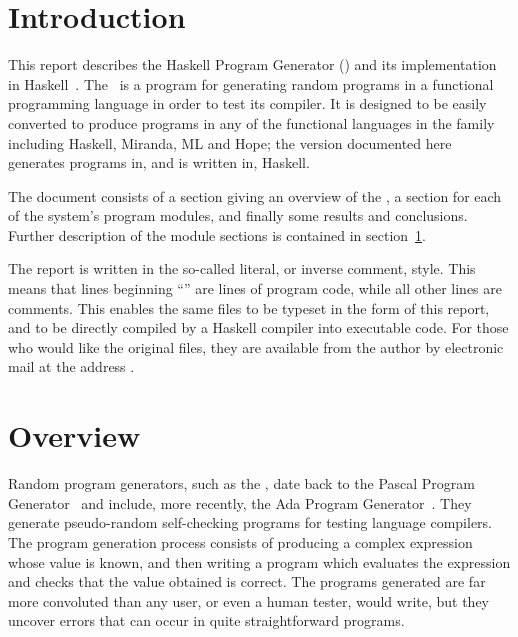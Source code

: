 


\section*{Introduction}

This report describes the Haskell Program Generator (\HPG) and its
implementation in Haskell~\cite{hudak}.
The \HPG\ is a program for generating random programs in a functional
programming language in order to test its compiler.
It is designed to be easily converted to produce programs in any of
the functional languages in the family including Haskell, Miranda,
ML and Hope; the version documented here generates programs in, and is
written in, Haskell.

The document consists of a section giving an overview of the \HPG,
a section for each of the system's program modules, and finally some
results and conclusions.
Further description of the module sections is contained in
section~\ref{overview}.

The report is written in the so-called literal, or inverse comment, style.
This means that lines beginning ``\prog{> }'' are lines of program code,
while all other lines are comments.
This enables the same files to be typeset in the form of this report, and
to be directly compiled by a Haskell compiler into executable code.
For those who would like the original files, they are available from the
author by electronic mail at the address .


\section{Overview}
\label{overview}

Random program generators, such as the \HPG, date back to the Pascal
Program Generator~\cite{wichmann} and include, more recently, the Ada
Program Generator~\cite{austin}.
They generate pseudo-random self-checking programs for testing language
compilers.
The program generation process consists of producing a complex expression
whose value is known, and then writing a program which evaluates the
expression and checks that the value obtained is correct.
The programs generated are far more convoluted than any user, or even
a human tester, would write, but they uncover errors that can occur in
quite straightforward programs.

